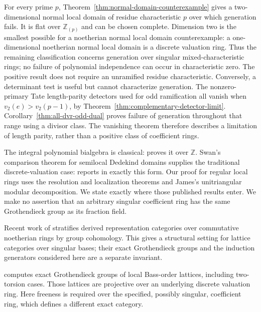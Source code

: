 \documentclass[11pt,a4paper]{article}
\theoremstyle{definition}\newtheorem{definition}[theorem]{Definition}
\theoremstyle{remark}\newtheorem{remark}[theorem]{Remark}
\newcommand{\Z}{\mathbb Z}\newcommand{\Q}{\mathbb Q}
\begin{document}
For every prime $p$, Theorem~\ref{thm:normal-domain-counterexample}
gives a two-dimensional normal local domain of residue characteristic
$p$ over which generation fails.  It is flat over $\Z_{(p)}$ and
can be chosen complete.  Dimension two is the smallest possible for
a noetherian normal local domain counterexample: a one-dimensional
noetherian normal local domain is a discrete valuation ring.
Thus the remaining classification concerns generation over singular
mixed-characteristic rings; no failure of polynomial independence
can occur in characteristic zero.  The positive result does not
require an unramified residue characteristic.  Conversely, a
determinant test is useful but cannot characterize generation.  The nonzero-primary Tate length-parity detectors used for odd
ramification all vanish when $v_2(e)>v_2(p-1)$,
by Theorem~\ref{thm:complementary-detector-limit}.
Corollary~\ref{thm:all-dvr-odd-dual} proves failure of generation
throughout that range using a divisor class.  The vanishing theorem
therefore describes a limitation of length parity, rather than a
positive class of coefficient rings.

The integral polynomial bialgebra is classical:
\citet[Proposition~1.1, p.~543, and Theorem~1.2, p.~544]{Burroughs1974}
proves it over $\Z$.  Swan's comparison theorem for semilocal
Dedekind domains supplies the traditional discrete-valuation case:
\citet[Addendum, p.~242]{Gersten1973} reports
\citet[Theorem~3, p.~87]{Swan1963} in exactly this form.  Our proof for regular local
rings uses the resolution and localization theorems and James's
unitriangular modular decomposition.  We state exactly where those
published results enter.  We make no assertion that an arbitrary
singular coefficient ring has the same Grothendieck group as its
fraction field.

Recent work of \citet[Theorem A, p.~2912]{BarthelEtAl2025}
stratifies derived representation categories over commutative
noetherian rings by group cohomology.  This gives a structural
setting for lattice categories over singular bases; their exact
Grothendieck groups and the induction generators considered here
are a separate invariant.

\citet[Section~2, p.~105; Theorem~3, p.~108]{Roggenkamp1971}
computes exact Grothendieck groups of local Bass-order lattices,
including two-torsion cases.  Those lattices are projective over an
underlying discrete valuation ring.  Here freeness is required over
the specified, possibly singular, coefficient ring, which defines
a different exact category.
\end{document}

